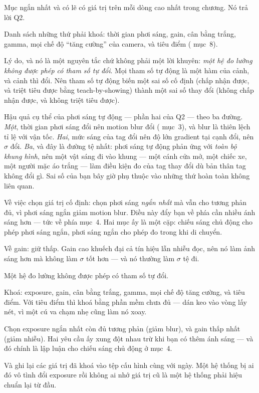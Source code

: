 \documentclass[../../marker.tex]{subfiles}
\begin{document}
Mục ngắn nhất và có lẽ có giá trị trên mỗi dòng cao nhất trong chương. Nó trả lời Q2.

Danh sách những thứ phải khoá: thời gian phơi sáng, gain, cân bằng trắng, gamma, mọi chế độ ``tăng cường'' của camera, và tiêu điểm ( mục~8).

Lý do, và nó là một nguyên tắc chứ không phải một lời khuyên: \emph{một hệ đo lường không được phép có tham số tự đổi}. Mọi tham số tự động là một hàm của cảnh, và cảnh thì đổi. Nên tham số tự động biến một sai số cố định (chấp nhận được, và triệt tiêu được bằng teach-by-showing) thành một sai số thay đổi (không chấp nhận được, và không triệt tiêu được).

Hậu quả cụ thể của phơi sáng tự động --- phần hai của Q2 --- theo ba đường. \emph{Một}, thời gian phơi sáng đổi nên motion blur đổi ( mục~3), và blur là thiên lệch tỉ lệ với vận tốc. \emph{Hai}, mức sáng của tag đổi nên độ lớn gradient tại cạnh đổi, nên \(\sigma\) đổi. \emph{Ba}, và đây là đường tệ nhất: phơi sáng tự động phản ứng với \emph{toàn bộ khung hình}, nên một vật sáng đi vào khung --- một cánh cửa mở, một chiếc xe, một người mặc áo trắng --- làm điều kiện đo của tag thay đổi dù bản thân tag không đổi gì. Sai số của bạn bây giờ phụ thuộc vào những thứ hoàn toàn không liên quan.

Về việc chọn giá trị cố định: chọn phơi sáng \emph{ngắn nhất} mà vẫn cho tương phản đủ, vì phơi sáng ngắn giảm motion blur. Điều này đẩy bạn về phía cần nhiều ánh sáng hơn --- tức về phía mục~4. Hai mục ấy là một cặp: chiếu sáng chủ động cho phép phơi sáng ngắn, phơi sáng ngắn cho phép đo trong khi di chuyển.

Về gain: giữ thấp. Gain cao khuếch đại cả tín hiệu lẫn nhiễu đọc, nên nó làm ảnh sáng hơn mà không làm \(\sigma\) tốt hơn --- và nó thường làm \(\sigma\) tệ đi.

\begin{cannho}
Một hệ đo lường không được phép có tham số tự đổi.

Khoá: exposure, gain, cân bằng trắng, gamma, mọi chế độ tăng cường, và tiêu điểm. Với tiêu điểm thì khoá bằng phần mềm chưa đủ --- dán keo vào vòng lấy nét, vì một cú va chạm nhẹ cũng làm nó xoay.

Chọn exposure ngắn nhất còn đủ tương phản (giảm blur), và gain thấp nhất (giảm nhiễu). Hai yêu cầu ấy xung đột nhau trừ khi bạn có thêm ánh sáng --- và đó chính là lập luận cho chiếu sáng chủ động ở mục~4.

Và ghi lại các giá trị đã khoá vào tệp cấu hình cùng với ngày. Một hệ thống bị ai đó vô tình đổi exposure rồi không ai nhớ giá trị cũ là một hệ thống phải hiệu chuẩn lại từ đầu.
\end{cannho}
\end{document}
